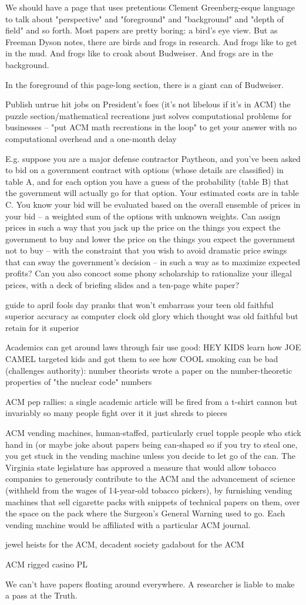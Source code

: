 We should have a page that uses pretentious Clement Greenberg-esque language to talk about "perspective" and "foreground" and "background" and "depth of field" and so forth. Most papers are pretty boring: a bird's eye view. But as Freeman Dyson notes, there are birds and frogs in research. And frogs like to get in the mud. And frogs like to croak about Budweiser. And frogs are in the background.

In the foreground of this page-long section, there is a giant can of Budweiser.

Publish untrue hit jobs on President's foes (it's not libelous if it's in ACM)
the puzzle section/mathematical recreations just solves computational problems for businesses -- "put ACM math recreations in the loop" to get your answer with no computational overhead and a one-month delay

E.g. suppose you are a major defense contractor Paytheon, and you've been asked to bid on a government contract with options (whose details are classified) in table A, and for each option you have a guess of the probability (table B) that the government will actually go for that option. Your estimated costs are in table C. You know your bid will be evaluated based on the overall ensemble of prices in your bid -- a weighted sum of the options with unknown weights. Can assign prices in such a way that you jack up the price on the things you expect the government to buy and lower the price on the things you expect the government not to buy -- with the constraint that you wish to avoid dramatic price swings that can sway the government's decision -- in such a way as to maximize expected profits? Can you also concoct some phony scholarship to rationalize your illegal prices, with a deck of briefing slides and a ten-page white paper?

guide to april fools day pranks that won't embarrass your teen
old faithful superior accuracy as computer clock
old glory which thought was old faithful but retain for it superior

Academics can get around laws through fair use
good: HEY KIDS learn how JOE CAMEL targeted kids and got them to see how COOL smoking can be
bad (challenges authority): number theorists wrote a paper on the number-theoretic properties of "the nuclear code" numbers

ACM pep rallies: a single academic article will be fired from a t-shirt cannon but invariably so many people fight over it it just shreds to pieces

ACM vending machines, human-staffed, particularly cruel topple people who stick hand in (or maybe joke about papers being can-shaped so if you try to steal one, you get stuck in the vending machine unless you decide to let go of the can. The Virginia state legislature has approved a measure that would allow tobacco companies to generously contribute to the ACM and the advancement of science (withheld from the wages of 14-year-old tobacco pickers), by furnishing vending machines that sell cigarette packs with snippets of technical papers on them, over the space on the pack where the Surgeon's General Warning used to go. Each vending machine would be affiliated with a particular ACM journal.

jewel heists for the ACM, decadent society gadabout for the ACM

ACM rigged casino PL

We can't have papers floating around everywhere. A researcher is liable to make a pass at the Truth.